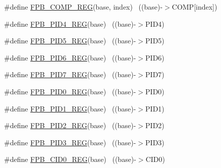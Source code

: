 \begin{DoxyCompactItemize}
\item 
\#define \hyperlink{group___f_p_b___register___accessor___macros_ga52fd8faa26cc52d39d15e4897e218bcb}{F\+P\+B\+\_\+\+C\+O\+M\+P\+\_\+\+R\+EG}(base,  index)                              ~((base)-\/$>$C\+O\+MP\mbox{[}index\mbox{]})
\item 
\#define \hyperlink{group___f_p_b___register___accessor___macros_gac4488406275c11c81ee5843d2686d198}{F\+P\+B\+\_\+\+P\+I\+D4\+\_\+\+R\+EG}(base)                                          ~((base)-\/$>$P\+I\+D4)
\item 
\#define \hyperlink{group___f_p_b___register___accessor___macros_ga7272b28f89b58ec02dab267cd22e503e}{F\+P\+B\+\_\+\+P\+I\+D5\+\_\+\+R\+EG}(base)                                          ~((base)-\/$>$P\+I\+D5)
\item 
\#define \hyperlink{group___f_p_b___register___accessor___macros_gaf5bfa0e3353fc7448eebb0069982ef26}{F\+P\+B\+\_\+\+P\+I\+D6\+\_\+\+R\+EG}(base)                                          ~((base)-\/$>$P\+I\+D6)
\item 
\#define \hyperlink{group___f_p_b___register___accessor___macros_gacd70110093ba38643ce4f76ca99d6c66}{F\+P\+B\+\_\+\+P\+I\+D7\+\_\+\+R\+EG}(base)                                          ~((base)-\/$>$P\+I\+D7)
\item 
\#define \hyperlink{group___f_p_b___register___accessor___macros_ga3f10cec0f0637403303c41c9088dc5bb}{F\+P\+B\+\_\+\+P\+I\+D0\+\_\+\+R\+EG}(base)                                          ~((base)-\/$>$P\+I\+D0)
\item 
\#define \hyperlink{group___f_p_b___register___accessor___macros_ga8859e6bda39b2725ed2f5d45e22d7b50}{F\+P\+B\+\_\+\+P\+I\+D1\+\_\+\+R\+EG}(base)                                          ~((base)-\/$>$P\+I\+D1)
\item 
\#define \hyperlink{group___f_p_b___register___accessor___macros_gac97cbee200bbd12a267ec742005eaa0f}{F\+P\+B\+\_\+\+P\+I\+D2\+\_\+\+R\+EG}(base)                                          ~((base)-\/$>$P\+I\+D2)
\item 
\#define \hyperlink{group___f_p_b___register___accessor___macros_gabc08353b16dcd1523e16e6cb4f2f6d55}{F\+P\+B\+\_\+\+P\+I\+D3\+\_\+\+R\+EG}(base)                                          ~((base)-\/$>$P\+I\+D3)
\item 
\#define \hyperlink{group___f_p_b___register___accessor___macros_ga0489173b7028d084cc37f751c01c3a45}{F\+P\+B\+\_\+\+C\+I\+D0\+\_\+\+R\+EG}(base)                                          ~((base)-\/$>$C\+I\+D0)
\item 

\end{DoxyCompactItemize}
